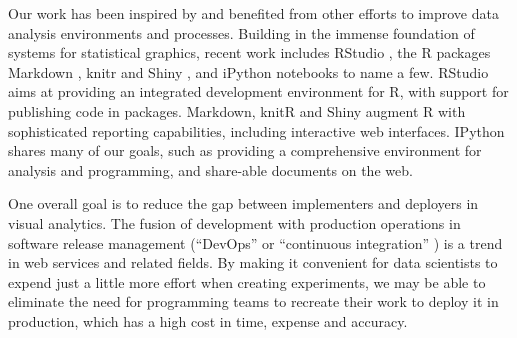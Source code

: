 Our work has been inspired by and benefited from other efforts
to improve data analysis environments and processes. Building in
the immense foundation of systems for statistical graphics,
recent work includes RStudio \cite{RStudio:2013:SWA},
the R packages Markdown \cite{Allaire:2014:MMR},
knitr \cite{Xie:2013:DDW}
and Shiny \cite{RStudio:2013:SWA},
and iPython notebooks \cite{Perez:2007:IAS}
to name a few. RStudio aims at providing an integrated development environment
for R, with support for publishing code in packages. Markdown,
knitR and Shiny augment R with sophisticated reporting capabilities, including
interactive web interfaces. IPython \cite{Perez:2007:IAS}
shares many of our goals, such as providing a comprehensive environment
for analysis and programming, and share-able documents on the web.

One overall goal is to reduce the gap between implementers and deployers
in visual analytics. The fusion of development with production
operations in software release management (``DevOps'' \cite{Httermann:2012:DD}
or ``continuous integration'' \cite{Fowler:2006:Continuous}) is a trend in web
services and related fields.
By making it convenient for data scientists to expend just a little more effort
when creating experiments, we may be able to eliminate the need for programming
teams to recreate their work to deploy it in production,
which has a high cost in time, expense and accuracy.
